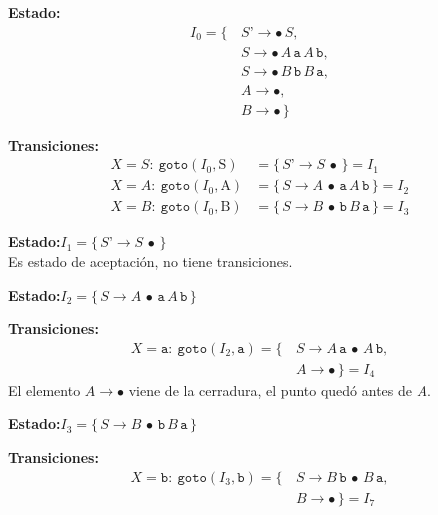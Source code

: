 \documentclass[12pt,letterpaper]{article}
\newcommand{\nt}[1]{\textit{#1}}
\newcommand{\tk}[1]{\texttt{#1}}
\newcommand{\tx}[1]{\text{#1}}
\begin{document}
\begin{enumerate}[label=\arabic*.]
  \medskip

  \textbf{Estado:}
  \[
  \begin{aligned}
    I_0 = \{\, & \nt{S'} \to \bullet\,\nt{S},\\
               & \nt{S}  \to \bullet\,\nt{A}\,\tk{a}\,\nt{A}\,\tk{b},\\
               & \nt{S}  \to \bullet\,\nt{B}\,\tk{b}\,\nt{B}\,\tk{a},\\
               & \nt{A}  \to \bullet,\\
               & \nt{B}  \to \bullet\,\}
  \end{aligned}
  \]

  \textbf{Transiciones:}
  \[
  \begin{aligned}
    X=\nt{S}:\ \texttt{goto}(I_0,\tx{S}) &= \{\,\nt{S'}\to\nt{S}\,\bullet\,\}
    = \boxed{I_1}\\[3pt]
    X=\nt{A}:\ \texttt{goto}(I_0,\tx{A}) &= \{\,\nt{S}\to\nt{A}\,\bullet\,\tk{a}\,\nt{A}\,\tk{b}\,\}
    = \boxed{I_2}\\[3pt]
    X=\nt{B}:\ \texttt{goto}(I_0,\tx{B}) &= \{\,\nt{S}\to\nt{B}\,\bullet\,\tk{b}\,\nt{B}\,\tk{a}\,\}
    = \boxed{I_3}
  \end{aligned}
  \]

  \medskip

  \textbf{Estado:}\quad $I_1 = \{\,\nt{S'}\to\nt{S}\,\bullet\,\}$\\
  Es estado de aceptación, no tiene transiciones.

  \medskip

  \textbf{Estado:}\quad $I_2 = \{\,\nt{S}\to\nt{A}\,\bullet\,\tk{a}\,\nt{A}\,\tk{b}\,\}$

  \textbf{Transiciones:}
  \[
  \begin{aligned}
    X=\tk{a}:\ \texttt{goto}(I_2,\tk{a}) = \{\, & \nt{S}\to\nt{A}\,\tk{a}\,\bullet\,\nt{A}\,\tk{b},\\
                                                & \nt{A}\to\bullet\,\} = \boxed{I_4}
  \end{aligned}
  \]
  El elemento $\nt{A}\to\bullet$ viene de la cerradura, el punto quedó antes de \nt{A}.

  \medskip

  \textbf{Estado:}\quad $I_3 = \{\,\nt{S}\to\nt{B}\,\bullet\,\tk{b}\,\nt{B}\,\tk{a}\,\}$

  \textbf{Transiciones:}
  \[
  \begin{aligned}
    X=\tk{b}:\ \texttt{goto}(I_3,\tk{b}) = \{\, & \nt{S}\to\nt{B}\,\tk{b}\,\bullet\,\nt{B}\,\tk{a},\\
                                              & \nt{B}\to\bullet\,\} = \boxed{I_7}
  \end{aligned}
  \]


\end{enumerate}
\end{document}
